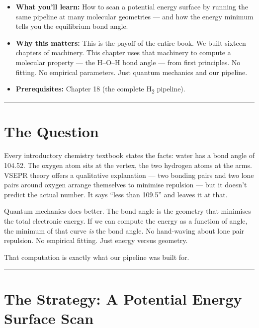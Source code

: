 \documentclass[
  11pt,
  oneside]{book}
\providecommand{\tightlist}{%
  \setlength{\itemsep}{0pt}\setlength{\parskip}{0pt}}
\begin{document}
\begin{itemize}
\tightlist
\item
  \textbf{What you'll learn:} How to scan a potential energy surface by
  running the same pipeline at many molecular geometries --- and how the
  energy minimum tells you the equilibrium bond angle.
\item
  \textbf{Why this matters:} This is the payoff of the entire book. We
  built sixteen chapters of machinery. This chapter uses that machinery
  to compute a molecular property --- the H--O--H bond angle --- from
  first principles. No fitting. No empirical parameters. Just quantum
  mechanics and our pipeline.
\item
  \textbf{Prerequisites:} Chapter 18 (the complete H\textsubscript{2} pipeline).
\end{itemize}

\begin{center}\rule{0.5\linewidth}{0.5pt}\end{center}

\section{The Question}\label{the-question-1}

Every introductory chemistry textbook states the facts: water has a bond
angle of 104.52\textdegree{}. The oxygen atom sits at the vertex, the two hydrogen
atoms at the arms. VSEPR theory offers a qualitative explanation --- two
bonding pairs and two lone pairs around oxygen arrange themselves to
minimise repulsion --- but it doesn't predict the actual number. It says
``less than 109.5\textdegree{}'' and leaves it at that.

Quantum mechanics does better. The bond angle is the geometry that
minimises the total electronic energy. If we can compute the energy as a
function of angle, the minimum of that curve \emph{is} the bond angle.
No hand-waving about lone pair repulsion. No empirical fitting. Just
energy versus geometry.

That computation is exactly what our pipeline was built for.

\begin{center}\rule{0.5\linewidth}{0.5pt}\end{center}

\section{The Strategy: A Potential Energy Surface
Scan}\label{the-strategy-a-potential-energy-surface-scan}
\end{document}
